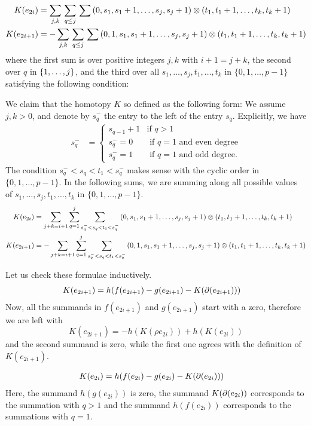 \begin{align*}
	K(e_{2i}) &= \sum_{j,k} \, \sum_{q \leq j} \, \sum \,
	(0,s_1,s_1+1,\dots,s_j,s_j+1) \otimes (t_1,t_1+1,\dots,t_k,t_k+1) \\
	K(e_{2i+1}) &= - \sum_{j,k} \, \sum_{q \leq j} \, \sum \,
	(0,1,s_1,s_1+1,\dots,s_j,s_j+1) \otimes (t_1,t_1+1,\dots,t_k,t_k+1)
\end{align*}
where the first sum is over positive integers $j,k$ with $i+1 = j+k$, the second over $q$ in $\{1,\dots,j\}$, and the third over all $s_1,\dots,s_j, t_1,\dots,t_k$ in $\{0,1,\dots,p-1\}$ satisfying the following condition:

We claim that the homotopy $K$ so defined as the following form: We assume $j,k>0$, and denote by $s_q^-$ the entry to the left of the entry $s_q$.
Explicitly, we have
\begin{align*}
	s_q^- &= \begin{cases}s_{q-1}+1 & \text{if $q>1$}\\
		s_q^- = 0 & \text{ if $q=1$ and even degree} \\
		s_q^- = 1 &\text{ if $q=1$ and odd degree.}
	\end{cases}
\end{align*}
The condition $s_q^-<s_q<t_1<s_q^-$ makes sense with the cyclic order in $\{0,1,\dots,p-1\}$.
In the following sums, we are summing along all possible values of $s_1,\dots,s_j,t_1,\dots,t_k$ in $\{0,1,\dots,p-1\}$.
\begin{align*}
	K(e_{2i}) &= \sum_{j+k = i+1}{\sum_{q=1}^j{\sum_{s_q^-<s_q<t_1<s_q^-}{(0,s_1,s_1+1,\dots,s_j,s_j+1)\otimes(t_1,t_1+1,\dots,t_k,t_k+1)}}} \\
	K(e_{2i+1}) &= -\sum_{j+k = i+1}{\sum_{q=1}^j{\sum_{s_q^-<s_q<t_1<s_q^-}{(0,1,s_1,s_1+1,\dots,s_j,s_j+1)\otimes(t_1,t_1+1,\dots,t_k,t_k+1)}}}
\end{align*}

Let us check these formulae inductively.
\begin{align*}
	K(e_{2i+1}) &= h(f(e_{2i+1})-g(e_{2i+1})-K(\operatorname{\partial}(e_{2i+1})))
\end{align*}
Now, all the summands in $f(e_{2i+1})$ and $g(e_{2i+1})$ start with a zero, therefore we are left with
\[K(e_{2i+1}) = -h(K(\rho e_{2i}))+h(K(e_{2i}))\]
and the second summand is zero, while the first one agrees with the definition of $K(e_{2i+1})$.

\begin{align*}
	K(e_{2i}) &= h(f(e_{2i})-g(e_{2i})-K(\operatorname{\partial}(e_{2i})))
\end{align*}
Here, the summand $h(g(e_{2i}))$ is zero, the summand $K(\operatorname{\partial}(e_{2i}))$ corresponds to the summation with $q>1$ and the summand $h(f(e_{2i}))$ corresponds to the summations with $q=1$.

